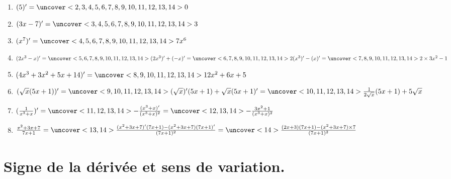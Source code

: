 \documentclass{beamer}
\begin{document}
  \begin{frame}
  
  \begin{example}
  \begin{enumerate}
  \item $(5)'=\uncover<2,3,4,5,6,7,8,9,10,11,12,13,14>{0}$
  \item $(3x-7)'=\uncover<3,4,5,6,7,8,9,10,11,12,13,14>{3}$
  \item $(x^7)'=\uncover<4,5,6,7,8,9,10,11,12,13,14>{7x^6}$
  \item $(2x^3-x)'=\uncover<5,6,7,8,9,10,11,12,13,14>{(2x^3)'+(-x)'}
  =\uncover<6,7,8,9,10,11,12,13,14>{2(x^3)'-(x)'}
  =\uncover<7,8,9,10,11,12,13,14>{2 \times 3 x^2-1}$
  \item $(4x^3+3x^2+5x+14)'=\uncover<8,9,10,11,12,13,14>{12x^2+6x+5}$
  \item $(\sqrt{x}(5x+1))'
  =\uncover<9,10,11,12,13,14>{(\sqrt{x})'(5x+1)+\sqrt{x}(5x+1)'}
  =\uncover<10,11,12,13,14>{\frac{1}{2\sqrt{x}}(5x+1)+5\sqrt{x}}$
  \item $(\frac{1}{x^3+x})'
  =\uncover<11,12,13,14>{-\frac{(x^3+x)'}{(x^3+x)^2}}
  =\uncover<12,13,14>{-\frac{3x^2+1}{(x^3+x)^2}}$
  \item $\frac{x^2+3x+7}{7x+1}
  =\uncover<13,14>{\frac{(x^2+3x+7)'(7x+1)-(x^2+3x+7)(7x+1)'}{(7x+1)^2}}
  =\uncover<14>{\frac{(2x+3)(7x+1)-(x^2+3x+7)\times 7}{(7x+1)^2}}$
  \end{enumerate}
  \end{example}
  
  \end{frame}
  
  \section{Signe de la dérivée et sens de variation.}
  
  \begin{frame}
  \end{frame}
\end{document}
